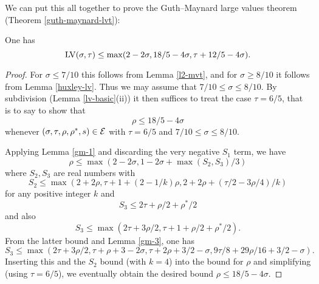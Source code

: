 We can put this all together to prove the Guth--Maynard large values theorem (Theorem \ref{guth-maynard-lvt}):


\begin{theorem}\label{guth-maynard-lvt-again} One has
    $$ \mathrm{LV}(\sigma,\tau) \leq \max(2-2\sigma, 18/5 - 4 \sigma, \tau + 12/5 - 4\sigma).$$
\end{theorem}

\begin{proof} For $\sigma \leq 7/10$ this follows from Lemma \ref{l2-mvt}, and for $\sigma \geq 8/10$ it follows from Lemma \ref{huxley-lv}.  Thus we may assume that $7/10 \leq \sigma \leq 8/10$.  By subdivision (Lemma \ref{lv-basic}(ii)) it then suffices to treat the case $\tau = 6/5$, that is to say to show that
    $$ \rho \leq 18/5-4\sigma$$
whenever $(\sigma,\tau,\rho,\rho^*,s) \in \mathcal{E}$ with $\tau=6/5$ and $7/10 \leq \sigma \leq 8/10$.

Applying Lemma \ref{gm-1} and discarding the very negative $S_1$ term, we have
$$ \rho \leq \max(2-2\sigma, 1-2\sigma + \max(S_2, S_3)/3)$$
where $S_2, S_3$ are real numbers with
$$ S_2 \leq \max(2+2\rho, \tau+1+(2-1/k) \rho, 2 + 2\rho + (\tau/2 - 3\rho/4)/k )$$
for any positive integer $k$ and
$$ S_3 \leq 2\tau + \rho/2 + \rho^*/2$$
and also
$$ S_3 \leq \max( 2\tau + 3\rho/2, \tau+1+\rho/2+\rho^*/2).$$
From the latter bound and Lemma \ref{gm-3}, one has
$$ S_3 \leq \max( 2\tau+3\rho/2, \tau+\rho+3-2\sigma, \tau+2\rho+3/2-\sigma, 9\tau/8+29\rho/16 + 3/2-\sigma).$$
Inserting this and the $S_2$ bound (with $k=4$) into the bound for $\rho$ and simplifying (using $\tau=6/5$), we eventually obtain
the desired bound $\rho \leq 18/5-4\sigma$.
\end{proof}

